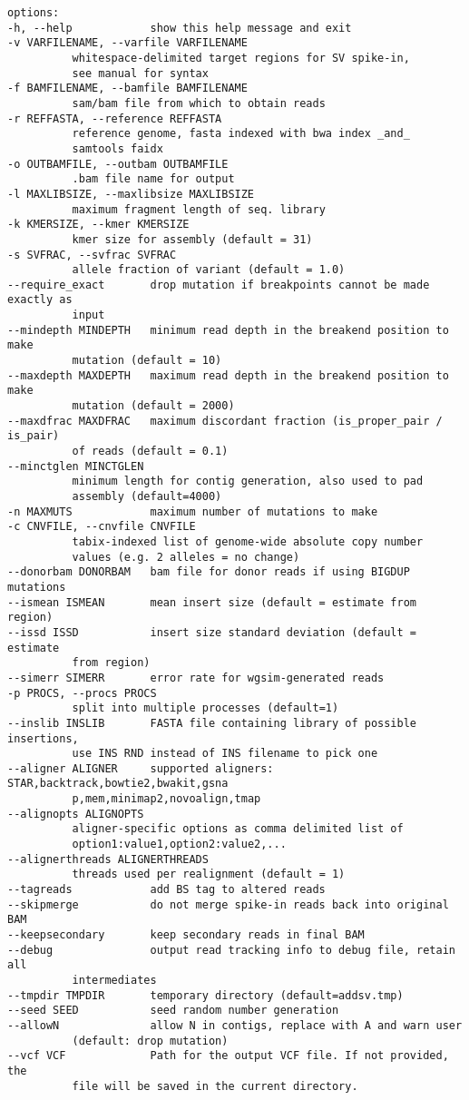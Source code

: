 \documentclass[letterpaper,11pt]{article}
\begin{document}
\begin{verbatim}
options:
-h, --help            show this help message and exit
-v VARFILENAME, --varfile VARFILENAME
          whitespace-delimited target regions for SV spike-in,
          see manual for syntax
-f BAMFILENAME, --bamfile BAMFILENAME
          sam/bam file from which to obtain reads
-r REFFASTA, --reference REFFASTA
          reference genome, fasta indexed with bwa index _and_
          samtools faidx
-o OUTBAMFILE, --outbam OUTBAMFILE
          .bam file name for output
-l MAXLIBSIZE, --maxlibsize MAXLIBSIZE
          maximum fragment length of seq. library
-k KMERSIZE, --kmer KMERSIZE
          kmer size for assembly (default = 31)
-s SVFRAC, --svfrac SVFRAC
          allele fraction of variant (default = 1.0)
--require_exact       drop mutation if breakpoints cannot be made exactly as
          input
--mindepth MINDEPTH   minimum read depth in the breakend position to make
          mutation (default = 10)
--maxdepth MAXDEPTH   maximum read depth in the breakend position to make
          mutation (default = 2000)
--maxdfrac MAXDFRAC   maximum discordant fraction (is_proper_pair / is_pair)
          of reads (default = 0.1)
--minctglen MINCTGLEN
          minimum length for contig generation, also used to pad
          assembly (default=4000)
-n MAXMUTS            maximum number of mutations to make
-c CNVFILE, --cnvfile CNVFILE
          tabix-indexed list of genome-wide absolute copy number
          values (e.g. 2 alleles = no change)
--donorbam DONORBAM   bam file for donor reads if using BIGDUP mutations
--ismean ISMEAN       mean insert size (default = estimate from region)
--issd ISSD           insert size standard deviation (default = estimate
          from region)
--simerr SIMERR       error rate for wgsim-generated reads
-p PROCS, --procs PROCS
          split into multiple processes (default=1)
--inslib INSLIB       FASTA file containing library of possible insertions,
          use INS RND instead of INS filename to pick one
--aligner ALIGNER     supported aligners: STAR,backtrack,bowtie2,bwakit,gsna
          p,mem,minimap2,novoalign,tmap
--alignopts ALIGNOPTS
          aligner-specific options as comma delimited list of
          option1:value1,option2:value2,...
--alignerthreads ALIGNERTHREADS
          threads used per realignment (default = 1)
--tagreads            add BS tag to altered reads
--skipmerge           do not merge spike-in reads back into original BAM
--keepsecondary       keep secondary reads in final BAM
--debug               output read tracking info to debug file, retain all
          intermediates
--tmpdir TMPDIR       temporary directory (default=addsv.tmp)
--seed SEED           seed random number generation
--allowN              allow N in contigs, replace with A and warn user
          (default: drop mutation)
--vcf VCF             Path for the output VCF file. If not provided, the
          file will be saved in the current directory.
  
\end{verbatim}
\end{document}
